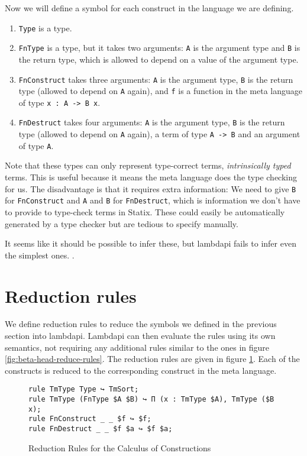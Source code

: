 Now we will define a symbol for each construct in the language we are defining.
\begin{enumerate}
	\item \verb|Type| is a type.
	\item \verb|FnType| is a type, but it takes two arguments: \verb|A| is the argument type and \verb|B| is the return type, which is allowed to depend on a value of the argument type.
	\item \verb|FnConstruct| takes three arguments: \verb|A| is the argument type, \verb|B| is the return type (allowed to depend on \verb|A| again), and \verb|f| is a function in the meta language of type \verb|x : A -> B x|.
	\item \verb|FnDestruct| takes four arguments: \verb|A| is the argument type, \verb|B| is the return type (allowed to depend on \verb|A| again), a term of type \verb|A -> B| and an argument of type \verb|A|. 
\end{enumerate}

Note that these types can only represent type-correct terms, \emph{intrinsically typed} terms. This is useful because it means the meta language does the type checking for us. The disadvantage is that it requires extra information: We need to give \verb|B| for \verb|FnConstruct| and \verb|A| and \verb|B| for \verb|FnDestruct|, which is information we don't have to provide to type-check terms in Statix. These could easily be automatically generated by a type checker but are tedious to specify manually. 

It seems like it should be possible to infer these, but lambdapi fails to infer even the simplest ones. .

\section{Reduction rules}

We define reduction rules to reduce the symbols we defined in the previous section into lambdapi. Lambdapi can then evaluate the rules using its own semantics, not requiring any additional rules similar to the ones in figure \ref{fig:beta-head-reduce-rules}. The reduction rules are given in figure \ref{fig:lp-rules}. Each of the constructs is reduced to the corresponding construct in the meta language.

\begin{figure}[ht]
	\begin{lstlisting}
rule TmType Type ↪ TmSort;
rule TmType (FnType $A $B) ↪ Π (x : TmType $A), TmType ($B x);
rule FnConstruct _ _ $f ↪ $f;
rule FnDestruct _ _ $f $a ↪ $f $a;
	\end{lstlisting}
	\caption{Reduction Rules for the Calculus of Constructions}
	\label{fig:lp-rules}
\end{figure}

